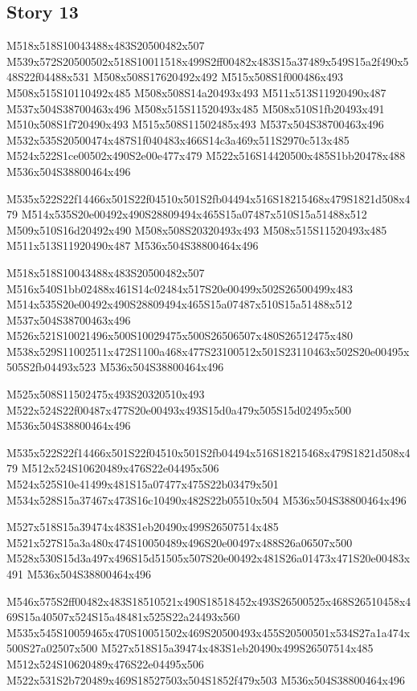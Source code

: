 \documentclass{article}
\begin{document}
\subsection{Story 13}

\begin{multicols}{5}
\begin{center}

M518x518S10043488x483S20500482x507 %
M539x572S20500502x518S10011518x499S2ff00482x483S15a37489x549S15a2f490x548S22f04488x531 %
M508x508S17620492x492 %
M515x508S1f000486x493 %
M508x515S10110492x485 %
M508x508S14a20493x493 %
M511x513S11920490x487 %
M537x504S38700463x496 %
M508x515S11520493x485 %
M508x510S1fb20493x491 %
M510x508S1f720490x493 %
M515x508S11502485x493 %
M537x504S38700463x496 %
M532x535S20500474x487S1f040483x466S14c3a469x511S2970c513x485 %
M524x522S1ce00502x490S2e00e477x479 %
M522x516S14420500x485S1bb20478x488 %
M536x504S38800464x496 %

M535x522S22f14466x501S22f04510x501S2fb04494x516S18215468x479S1821d508x479 %
M514x535S20e00492x490S28809494x465S15a07487x510S15a51488x512 %
M509x510S16d20492x490 %
M508x508S20320493x493 %
M508x515S11520493x485 %
M511x513S11920490x487 %
M536x504S38800464x496 %

M518x518S10043488x483S20500482x507 %
M516x540S1bb02488x461S14c02484x517S20e00499x502S26500499x483 %
M514x535S20e00492x490S28809494x465S15a07487x510S15a51488x512 %
M537x504S38700463x496 %
M526x521S10021496x500S10029475x500S26506507x480S26512475x480 %
M538x529S11002511x472S1100a468x477S23100512x501S23110463x502S20e00495x505S2fb04493x523 %
M536x504S38800464x496 %

M525x508S11502475x493S20320510x493 %
M522x524S22f00487x477S20e00493x493S15d0a479x505S15d02495x500 %
M536x504S38800464x496 %

M535x522S22f14466x501S22f04510x501S2fb04494x516S18215468x479S1821d508x479 %
M512x524S10620489x476S22e04495x506 %
M524x525S10e41499x481S15a07477x475S22b03479x501 %
M534x528S15a37467x473S16c10490x482S22b05510x504 %
M536x504S38800464x496 %

M527x518S15a39474x483S1eb20490x499S26507514x485 %
M521x527S15a3a480x474S10050489x496S20e00497x488S26a06507x500 %
M528x530S15d3a497x496S15d51505x507S20e00492x481S26a01473x471S20e00483x491 %
M536x504S38800464x496 %

M546x575S2ff00482x483S18510521x490S18518452x493S26500525x468S26510458x469S15a40507x524S15a48481x525S22a24493x560 %
M535x545S10059465x470S10051502x469S20500493x455S20500501x534S27a1a474x500S27a02507x500 %
M527x518S15a39474x483S1eb20490x499S26507514x485 %
M512x524S10620489x476S22e04495x506 %
M522x531S2b720489x469S18527503x504S1852f479x503 %
M536x504S38800464x496 %


\end{center}
\end{multicols}
\end{document}
